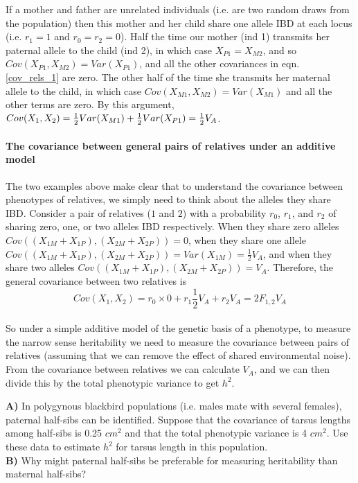 If a mother and father are unrelated individuals (i.e. are two
random draws from the population) then this mother and her child share
one allele IBD at each locus (i.e. $r_1=1$ and $r_0=r_2=0$). Half the
time our mother (ind 1) transmits her paternal allele to the child (ind 2), in which
case $X_{P1}=X_{M2}$, and so $Cov(X_{P1},X_{M2})=Var(X_{P1})$, and all
the other covariances in eqn. \ref{cov_rels_1} are zero. The other half of the time she transmits her maternal allele to the child, in which case
$Cov(X_{M1},X_{M2})=Var(X_{M1})$ and all the other terms are zero. By this
argument, $Cov(X_1,X_2) = \tfrac{1}{2} Var(X_{M1}) + \tfrac{1}{2} Var(X_{P1}) = \tfrac{1}{2}
V_A$. \\



\paragraph{The covariance between general pairs of relatives under an
additive model}


The two examples above make clear that to understand the covariance between
phenotypes of relatives, we simply need to think about the alleles they
share IBD. Consider a pair of relatives ($1$ and $2$) with a probability $r_0$,
$r_1$, and $r_2$ of sharing zero, one, or two alleles IBD
respectively. When they share zero alleles
$Cov((X_{1M}+X_{1P}),(X_{2M}+X_{2P}))=0$, when they share one allele
$Cov((X_{1M}+X_{1P}),(X_{2M}+X_{2P}))=
Var(X_{1M})=\frac{1}{2}V_A$, and when they share two alleles $Cov((X_{1M}+X_{1P}),(X_{2M}+X_{2P}))=
V_A$. Therefore, the general covariance between two
relatives is
\begin{equation}
Cov(X_1,X_2) = r_0 \times 0 + r_1 \frac{1}{2}V_A + r_2  V_A =
2 F_{1,2} V_A  \label{additive_covar_general_rellys}
\end{equation}\\
So under a simple additive model of the genetic basis of a phenotype,
to measure the narrow sense heritability we need to measure the
covariance between pairs of relatives (assuming that we can remove the effect of
shared environmental noise). From the covariance between relatives we
can calculate $V_A$, and we can then divide this by the total phenotypic
variance to get $h^2$. \\



\begin{question}
{\bf A)} In polygynous blackbird populations (i.e. males mate with
several females), paternal half-sibs can be identified.  Suppose that
the covariance of tarsus lengths among half-sibs is 0.25 $cm^2$ and
that the total phenotypic variance is 4 $cm^2$.  Use these data to
estimate $h^2$ for tarsus length in this population. \\

{\bf B)} Why might paternal half-sibs be preferable for measuring
heritability than maternal half-sibs? 
\end{question}

